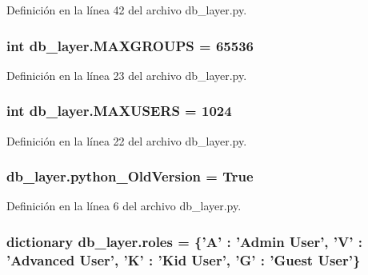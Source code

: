 Definición en la línea 42 del archivo db\-\_\-layer.\-py.

\hypertarget{namespacedb__layer_aa86922899182c14d523d4d72a501089b}{
\subsubsection[{M\-A\-X\-G\-R\-O\-U\-P\-S}]{\setlength{\rightskip}{0pt plus 5cm}int db\-\_\-layer.\-M\-A\-X\-G\-R\-O\-U\-P\-S = 65536}}\label{namespacedb__layer_aa86922899182c14d523d4d72a501089b}


Definición en la línea 23 del archivo db\-\_\-layer.\-py.

\hypertarget{namespacedb__layer_a649e55a17a43790deef2961f2ca5c396}{
\subsubsection[{M\-A\-X\-U\-S\-E\-R\-S}]{\setlength{\rightskip}{0pt plus 5cm}int db\-\_\-layer.\-M\-A\-X\-U\-S\-E\-R\-S = 1024}}\label{namespacedb__layer_a649e55a17a43790deef2961f2ca5c396}


Definición en la línea 22 del archivo db\-\_\-layer.\-py.

\hypertarget{namespacedb__layer_a8fd2ce6ee0abd7a51e1ec8fe295a5a6b}{
\subsubsection[{python\-\_\-\-Old\-Version}]{\setlength{\rightskip}{0pt plus 5cm}db\-\_\-layer.\-python\-\_\-\-Old\-Version = True}}\label{namespacedb__layer_a8fd2ce6ee0abd7a51e1ec8fe295a5a6b}


Definición en la línea 6 del archivo db\-\_\-layer.\-py.

\hypertarget{namespacedb__layer_a0d5b65488cbaa2ab5d2cdb3c69a98c79}{
\subsubsection[{roles}]{\setlength{\rightskip}{0pt plus 5cm}dictionary db\-\_\-layer.\-roles = \{'A' \-: 'Admin {\bf User}', 'V' \-: 'Advanced {\bf User}', 'K' \-: 'Kid {\bf User}', 'G' \-: 'Guest {\bf User}'\}}}\label{namespacedb__layer_a0d5b65488cbaa2ab5d2cdb3c69a98c79}


